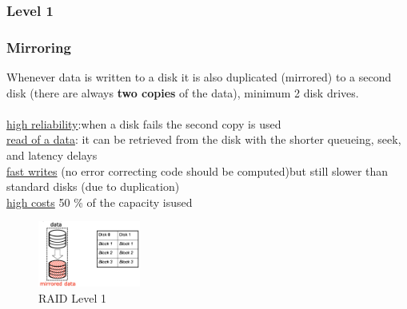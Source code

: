 \documentclass[10pt, oneside]{article}
\begin{document}
\subsubsection{Level 1}
\begin{multicols}{2}
    \subsubsection*{Mirroring}
    Whenever data is written to a disk it is also duplicated (mirrored) to a second disk (there are always {\bf two copies} of the data), minimum 2 disk drives.\\\\
    \underline{high reliability}:when a disk fails the second copy is used\\
    \underline{read of a data}: it can be retrieved from the disk with the shorter queueing, seek, and latency delays\\
    \underline{fast writes} (no error correcting code should be computed)but still slower than standard disks (due to duplication)\\
    \underline{high costs} 50 \% of the capacity isused
    \columnbreak
    \begin{figure}[H]
        \begin{center}
        \includegraphics[width=0.3\textwidth]{img/img66.png}
        \caption{RAID Level 1}
        \end{center}
    \end{figure}
\end{multicols}
\end{document}
